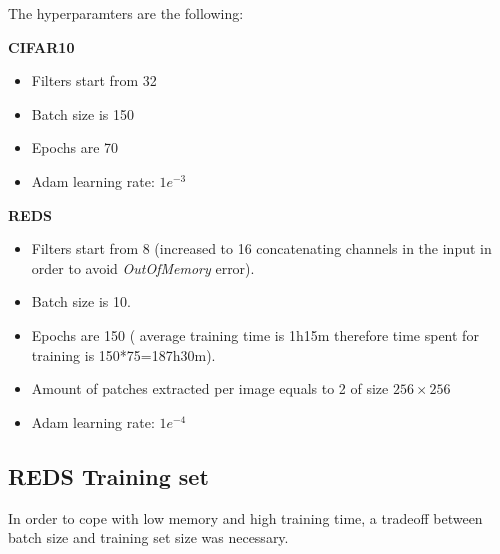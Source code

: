 The hyperparamters are the following:
\begin{center}
    \begin{minipage}[t]{0.5\textwidth}
        \textbf{CIFAR10}
        \begin{itemize}
            \item Filters start from 32
            \item Batch size is 150
            \item Epochs are 70
            \item Adam learning rate: $1e^{-3}$
        \end{itemize}
    \end{minipage}%
    \begin{minipage}[t]{0.5\textwidth}
        \textbf{REDS}
        \begin{itemize}
            \item Filters start from 8 (increased to 16 concatenating channels in the input in order to avoid \textit{OutOfMemory} error).
            \item Batch size is 10.
            \item Epochs are 150 ( average training time is 1h15m therefore time spent for training is 150*75=187h30m).
            \item Amount of patches extracted per image equals to 2 of size $256 \times 256$
            \item Adam learning rate: $1e^{-4}$
        \end{itemize}
    \end{minipage}        
\end{center}



\subsection{REDS Training set}

In order to cope with low memory and high training time, a tradeoff between batch size and training set size was necessary. 

